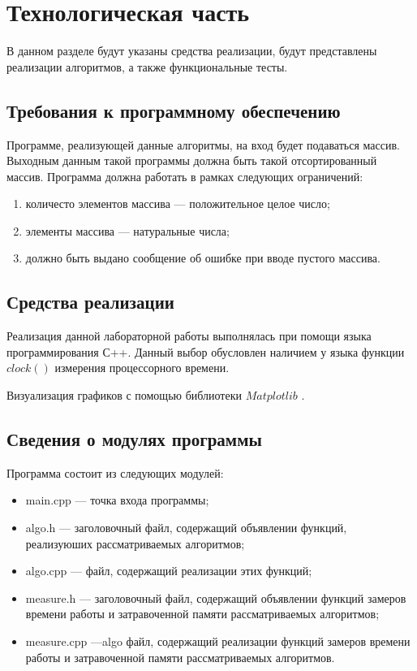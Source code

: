 \chapter{Технологическая часть}

В данном разделе будут указаны средства реализации, будут представлены реализации алгоритмов, а также функциональные тесты.

\section{Требования к программному обеспечению}
Программе, реализующей данные алгоритмы, на вход будет подаваться массив. Выходным данным такой программы должна быть такой отсортированный массив. Программа должна работать в рамках следующих ограничений: 

\begin{enumerate}
	\item количесто элементов массива --- положительное целое число;
	\item элементы массива --- натуральные числа;
	\item должно быть выдано сообщение об ошибке при вводе пустого массива.
\end{enumerate}


\section{Средства реализации}
Реализация данной лабораторной работы выполнялась при помощи языка программирования С++. Данный выбор обусловлен наличием у языка функции $clock()$ \cite {clock} измерения процессорного времени.

Визуализация графиков с помощью библиотеки $Matplotlib$ \cite {matplot}.

\section{Сведения о модулях программы}

Программа состоит из следующих модулей:

\begin{itemize}
	\item main.cpp --- точка входа программы;
	\item algo.h --- заголовочный файл, содержащий объявлении функций, реализуюших рассматриваемых алгоритмов;
	\item algo.cpp --- файл, содержащий реализации этих функций;
	\item measure.h --- заголовочный файл, содержащий объявлении функций замеров времени работы и затравоченной памяти рассматриваемых алгоритмов;
	\item measure.cpp ---algo файл, содержащий реализации функций замеров времени работы и затравоченной памяти рассматриваемых алгоритмов.
\end{itemize}


